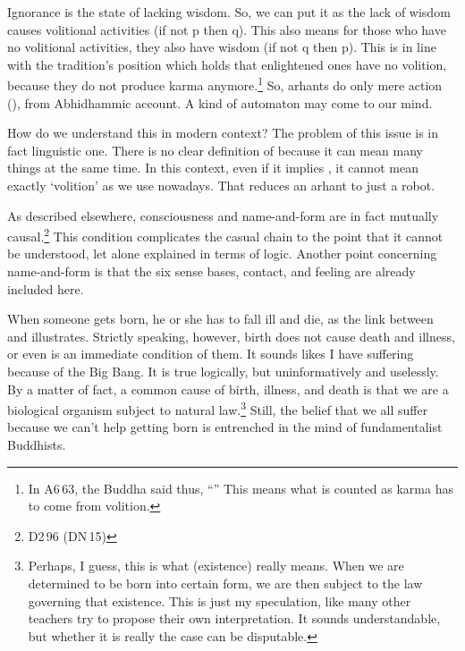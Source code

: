\begin{compactenum}[(1)]
\item Ignorance is the state of lacking wisdom. So, we can put it as the lack of wisdom causes volitional activities (if not p then q). This also means for those who have no volitional activities, they also have wisdom (if not q then p). This is in line with the tradition's position which holds that enlightened ones have no volition, because they do not produce karma anymore.\footnote{In A6\,63, the Buddha said thus, ``'' This means what is counted as karma has to come from volition.} So, arhants do only mere action (), from Abhidhammic account. A kind of automaton may come to our mind.\par
\hspace{5mm}How do we understand this in modern context? The problem of this issue is in fact linguistic one. There is no clear definition of  because it can mean many things at the same time. In this context, even if it implies , it cannot mean exactly `volition' as we use nowadays. That reduces an arhant to just a robot.
\item As described elsewhere, consciousness and name-and-form are in fact mutually causal.\footnote{D2\,96 (DN\,15)} This condition complicates the casual chain to the point that it cannot be understood, let alone explained in terms of logic. Another point concerning name-and-form is that the six sense bases, contact, and feeling are already included here.
\item When someone gets born, he or she has to fall ill and die, as the link between  and  illustrates. Strictly speaking, however, birth does not cause death and illness, or even is an immediate condition of them. It sounds likes I have suffering because of the Big Bang. It is true logically, but uninformatively and uselessly. By a matter of fact, a common cause of birth, illness, and death is that we are a biological organism subject to natural law.\footnote{Perhaps, I guess, this is what  (existence) really means. When we are determined to be born into certain form, we are then subject to the law governing that existence. This is just my speculation, like many other teachers try to propose their own interpretation. It sounds understandable, but whether it is really the case can be disputable.} Still, the belief that we all suffer because we can't help getting born is entrenched in the mind of fundamentalist Buddhists.
\end{compactenum}

